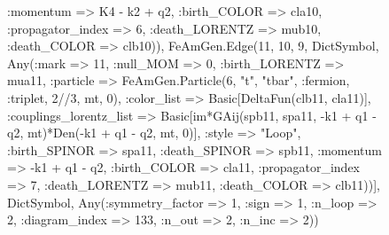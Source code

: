 \documentclass{revtex4}
\begin{document}
\begin{figure}[!htb]
\begin{center}
{:momentum => K4 - k2 + q2, :birth_COLOR => cla10, :propagator_index => 6, :death_LORENTZ => mub10, :death_COLOR => clb10)), FeAmGen.Edge(11, 10, 9, Dict{Symbol, Any}(:mark => 11, :null_MOM => 0, :birth_LORENTZ => mua11, :particle => FeAmGen.Particle(6, "t", "tbar", :fermion, :triplet, 2//3, mt, 0), :color_list => Basic[DeltaFun(clb11, cla11)], :couplings_lorentz_list => Basic[im*GAij(spb11, spa11, -k1 + q1 - q2, mt)*Den(-k1 + q1 - q2, mt, 0)], :style => "Loop", :birth_SPINOR => spa11, :death_SPINOR => spb11, :momentum => -k1 + q1 - q2, :birth_COLOR => cla11, :propagator_index => 7, :death_LORENTZ => mub11, :death_COLOR => clb11))], Dict{Symbol, Any}(:symmetry_factor => 1, :sign => 1, :n_loop => 2, :diagram_index => 133, :n_out => 2, :n_inc => 2)) 
}
\end{center}
\end{figure}
\end{document}
